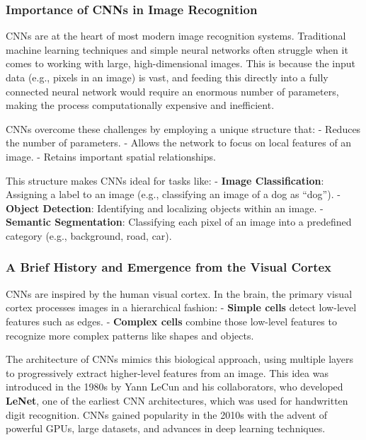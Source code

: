 \documentclass[
  letterpaper,
  DIV=11,
  numbers=noendperiod]{scrreprt}
\begin{document}
\subsubsection{Importance of CNNs in Image
Recognition}\label{importance-of-cnns-in-image-recognition}

CNNs are at the heart of most modern image recognition systems.
Traditional machine learning techniques and simple neural networks often
struggle when it comes to working with large, high-dimensional images.
This is because the input data (e.g., pixels in an image) is vast, and
feeding this directly into a fully connected neural network would
require an enormous number of parameters, making the process
computationally expensive and inefficient.

CNNs overcome these challenges by employing a unique structure that: -
Reduces the number of parameters. - Allows the network to focus on local
features of an image. - Retains important spatial relationships.

This structure makes CNNs ideal for tasks like: - \textbf{Image
Classification}: Assigning a label to an image (e.g., classifying an
image of a dog as ``dog''). - \textbf{Object Detection}: Identifying and
localizing objects within an image. - \textbf{Semantic Segmentation}:
Classifying each pixel of an image into a predefined category (e.g.,
background, road, car).

\subsubsection{A Brief History and Emergence from the Visual
Cortex}\label{a-brief-history-and-emergence-from-the-visual-cortex}

CNNs are inspired by the human visual cortex. In the brain, the primary
visual cortex processes images in a hierarchical fashion: -
\textbf{Simple cells} detect low-level features such as edges. -
\textbf{Complex cells} combine those low-level features to recognize
more complex patterns like shapes and objects.

The architecture of CNNs mimics this biological approach, using multiple
layers to progressively extract higher-level features from an image.
This idea was introduced in the 1980s by Yann LeCun and his
collaborators, who developed \textbf{LeNet}, one of the earliest CNN
architectures, which was used for handwritten digit recognition. CNNs
gained popularity in the 2010s with the advent of powerful GPUs, large
datasets, and advances in deep learning techniques.
\end{document}
